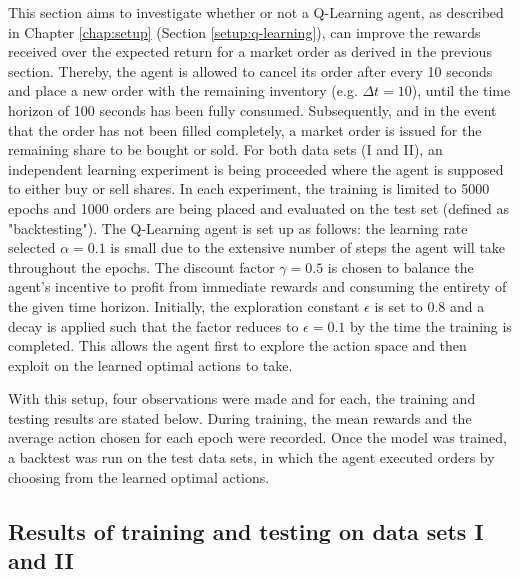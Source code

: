 This section aims to investigate whether or not a Q-Learning agent, as described in Chapter \ref{chap:setup} (Section \ref{setup:q-learning}), can improve the rewards received over the expected return for a market order as derived in the previous section.
Thereby, the agent is allowed to cancel its order after every 10 seconds and place a new order with the remaining inventory (e.g. $\Delta{t}=10$), until the time horizon of 100 seconds has been fully consumed.
Subsequently, and in the event that the order has not been filled completely, a market order is issued for the remaining share to be bought or sold.
For both data sets (I and II), an independent learning experiment is being proceeded where the agent is supposed to either buy or sell shares.
In each experiment, the training is limited to 5000 epochs and 1000 orders are being placed and evaluated on the test set (defined as "backtesting").
The Q-Learning agent is set up as follows:
the learning rate selected $\alpha=0.1$ is small due to the extensive number of steps the agent will take throughout the epochs.
The discount factor $\gamma=0.5$ is chosen to balance the agent's incentive to profit from immediate rewards and consuming the entirety of the given time horizon.
Initially, the exploration constant $\epsilon$ is set to 0.8 and a decay is applied such that the factor reduces to $\epsilon=0.1$ by the time the training is completed.
This allows the agent first to explore the action space and then exploit on the learned optimal actions to take.

With this setup, four observations were made and for each, the training and testing results are stated below.
During training, the mean rewards and the average action chosen for each epoch were recorded.
Once the model was trained, a backtest was run on the test data sets, in which the agent executed orders by choosing from the learned optimal actions.

\subsection{Results of training and testing on data sets I and II}

